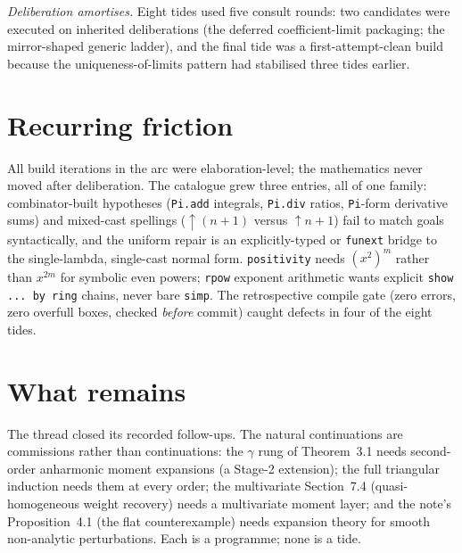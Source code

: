 \documentclass[11pt]{article}
\begin{document}
\emph{Deliberation amortises.} Eight tides used five consult rounds:
two candidates were executed on inherited deliberations (the deferred
coefficient-limit packaging; the mirror-shaped generic ladder), and the
final tide was a first-attempt-clean build because the
uniqueness-of-limits pattern had stabilised three tides earlier.

\section{Recurring friction}

All build iterations in the arc were elaboration-level; the mathematics
never moved after deliberation. The catalogue grew three entries, all
of one family: combinator-built hypotheses (\texttt{Pi.add} integrals,
\texttt{Pi.div} ratios, \texttt{Pi}-form derivative sums) and
mixed-cast spellings ($\uparrow\!(n{+}1)$ versus $\uparrow\!n + 1$)
fail to match goals syntactically, and the uniform repair is an
explicitly-typed or \texttt{funext} bridge to the single-lambda,
single-cast normal form. \texttt{positivity} needs $(x^2)^m$ rather
than $x^{2m}$ for symbolic even powers; \texttt{rpow} exponent
arithmetic wants explicit \texttt{show ... by ring} chains, never bare
\texttt{simp}. The retrospective compile gate (zero errors, zero
overfull boxes, checked \emph{before} commit) caught defects in four of
the eight tides.

\section{What remains}

The thread closed its recorded follow-ups. The natural continuations
are commissions rather than continuations: the $\gamma$ rung of
Theorem~3.1 needs second-order anharmonic moment expansions (a Stage-2
extension); the full triangular induction needs them at every order;
the multivariate Section~7.4 (quasi-homogeneous weight recovery) needs
a multivariate moment layer; and the note's Proposition~4.1 (the flat
counterexample) needs expansion theory for smooth non-analytic
perturbations. Each is a programme; none is a tide.
\end{document}
